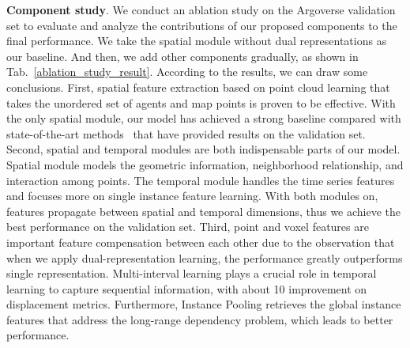 \documentclass[final]{cvpr}
\begin{document}
\textbf{Component study}. We conduct an ablation study on the Argoverse validation set to evaluate and analyze the contributions of our proposed components to the final performance. We take the spatial module without dual representations as our baseline. And then, we add other components gradually, as shown in Tab.~\ref{ablation_study_result}. According to the results, we can draw some conclusions. First, spatial feature extraction based on point cloud learning that takes the unordered set of agents and map points is proven to be effective. With the only spatial module, our model has achieved a strong baseline compared with state-of-the-art methods~\cite{chai2019multipath, gao2020vectornet} that have provided results on the validation set. Second, spatial and temporal modules are both indispensable parts of our model. Spatial module models the geometric information, neighborhood relationship, and interaction among points. The temporal module handles the time series features and focuses more on single instance feature learning. With both modules on, features propagate between spatial and temporal dimensions, thus we achieve the best performance on the validation set. 
Third, point and voxel features are important feature compensation between each other due to the observation that when we apply dual-representation learning, the performance greatly outperforms single representation. Multi-interval learning plays a crucial role in temporal learning to capture sequential information, with about 10 improvement on displacement metrics. Furthermore, Instance Pooling retrieves the global instance features that address the long-range dependency problem, which leads to better performance. 
\end{document}
